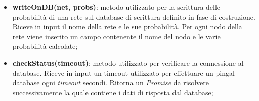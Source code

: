 \begin{itemize}
	\item \textbf{writeOnDB(net, probs)}: metodo utilizzato per la scrittura delle probabilità di una rete sul
	database di scrittura definito in fase di costruzione. Riceve in input il nome della rete e le sue probabilità. 
	Per ogni nodo della rete viene inserito un campo contenente il nome del nodo e le varie probabilità
	calcolate; 
	
	\item \textbf{checkStatus(timeout)}: metodo utilizzato per verificare la connessione al database. 
	Riceve in input un timeout utilizzato per effettuare un ping\glossario al database ogni 
	\textit{timeout} secondi. Ritorna un \textit{Promise} da risolvere successivamente la quale 
	contiene i dati di risposta dal database; 

\end{itemize}








